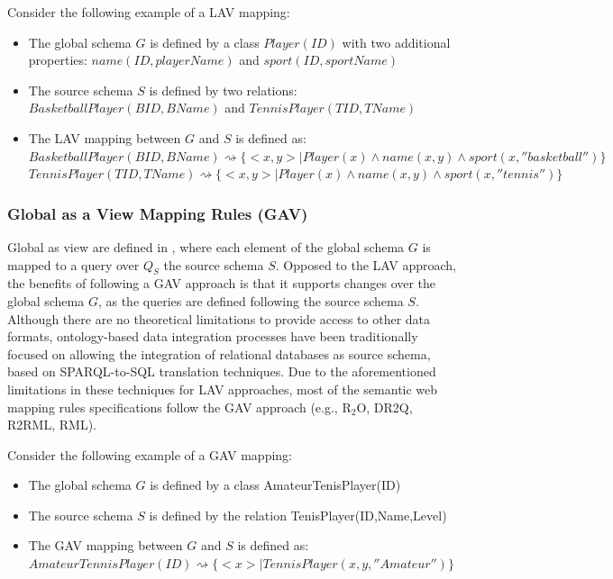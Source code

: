 Consider the following example of a LAV mapping:
\begin{itemize}
    \item The global schema $G$ is defined by a class $Player(ID)$ with two additional properties: $name(ID, playerName)$ and $sport(ID,sportName)$
    \item The source schema $S$ is defined by two relations: $BasketballPlayer (BID, BName)$ and $TennisPlayer (TID, TName)$
    \item The LAV mapping between $G$ and $S$ is defined as:\\
    $BasketballPlayer(BID,BName) \rightsquigarrow \{<x,y>|Player(x)\wedge name(x,y) \wedge sport(x,''basketball'')\}$\\
    $TennisPlayer(TID,TName) \rightsquigarrow \{<x,y>|Player(x)\wedge name(x,y) \wedge sport(x,''tennis'')\}$
\end{itemize}

\subsubsection{Global as a View Mapping Rules (GAV)}
Global as view are defined in \citep{halevy2001answering}, where each element of the global schema $G$ is mapped to a query over $Q_S$ the source schema $S$. Opposed to the LAV approach, the benefits of following a GAV approach is that it supports changes over the global schema $G$, as the queries are defined following the source schema $S$. Although there are no theoretical limitations to provide access to other data formats, ontology-based data integration processes have been traditionally focused on allowing the integration of relational databases as source schema, based on SPARQL-to-SQL translation techniques. Due to the aforementioned limitations in these techniques for LAV approaches, most of the semantic web mapping rules specifications follow the GAV approach (e.g., R$_2$O, DR2Q, R2RML, RML). 

Consider the following example of a GAV mapping:
\begin{itemize}
    \item The global schema $G$ is defined by a class AmateurTenisPlayer(ID)
    \item The source schema $S$ is defined by the relation TenisPlayer(ID,Name,Level)
    \item The GAV mapping between $G$ and $S$ is defined as:\\
    $AmateurTennisPlayer(ID) \rightsquigarrow \{<x> | TennisPlayer(x,y,''Amateur'')\}$
\end{itemize}

